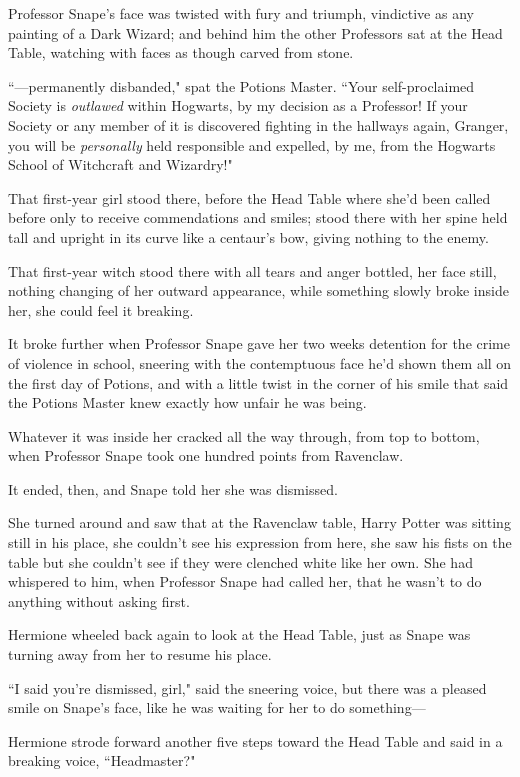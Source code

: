 Professor Snape's face was twisted with fury and triumph, vindictive as any painting of a Dark Wizard; and behind him the other Professors sat at the Head Table, watching with faces as though carved from stone.

``—permanently disbanded," spat the Potions Master. ``Your self-proclaimed Society is \emph{outlawed} within Hogwarts, by my decision as a Professor! If your Society or any member of it is discovered fighting in the hallways again, Granger, you will be \emph{personally} held responsible and expelled, by me, from the Hogwarts School of Witchcraft and Wizardry!"

That first-year girl stood there, before the Head Table where she'd been called before only to receive commendations and smiles; stood there with her spine held tall and upright in its curve like a centaur's bow, giving nothing to the enemy.

That first-year witch stood there with all tears and anger bottled, her face still, nothing changing of her outward appearance, while something slowly broke inside her, she could feel it breaking.

It broke further when Professor Snape gave her two weeks detention for the crime of violence in school, sneering with the contemptuous face he'd shown them all on the first day of Potions, and with a little twist in the corner of his smile that said the Potions Master knew exactly how unfair he was being.

Whatever it was inside her cracked all the way through, from top to bottom, when Professor Snape took one hundred points from Ravenclaw.

It ended, then, and Snape told her she was dismissed.

She turned around and saw that at the Ravenclaw table, Harry Potter was sitting still in his place, she couldn't see his expression from here, she saw his fists on the table but she couldn't see if they were clenched white like her own. She had whispered to him, when Professor Snape had called her, that he wasn't to do anything without asking first.

Hermione wheeled back again to look at the Head Table, just as Snape was turning away from her to resume his place.

``I said you're dismissed, girl," said the sneering voice, but there was a pleased smile on Snape's face, like he was waiting for her to do something—

Hermione strode forward another five steps toward the Head Table and said in a breaking voice, ``Headmaster?"

